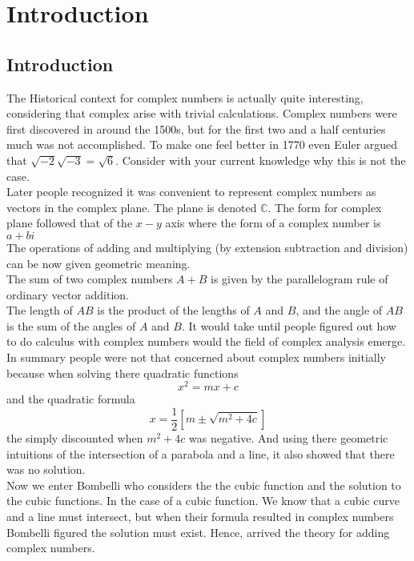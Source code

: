 \chapter{Introduction}
\section{Introduction}
		\indent The Historical context for complex numbers is actually quite interesting, considering that complex arise with trivial calculations. Complex numbers were first discovered in around the 1500s, but for the first two and a half centuries much was not accomplished. To make one feel better in 1770 even Euler argued that $ \sqrt{-2} \sqrt{-3} = \sqrt{6}$. Consider with your current knowledge why this is not the case. \\
		\indent Later people recognized it was convenient to represent complex numbers as vectors in the complex plane. The plane is denoted $ \mathbb{C} $. The form for complex plane followed that of the $ x-y $ axis where the form of a complex number is $ a + bi $ \\ 
		\indent The operations of adding and multiplying (by extension subtraction and division) can be now given geometric meaning. \\
		\indent The sum of two complex numbers $ A + B$ is given by the parallelogram rule of ordinary vector addition. \\ 
		\indent The length of $ AB $ is the product of the lengths of $ A $ and $ B $, and the angle of $ AB $ is the sum of the angles of $ A $ and $ B $. 
		\indent It would take until people figured out how to do calculus with complex numbers would the field of complex analysis emerge. \pagebreak
		\indent In summary people were not that concerned about complex numbers initially because when solving there quadratic functions 
		\[ x^2 = mx + c \] and the quadratic formula 
		\[ x = \dfrac{1}{2} [m \pm \sqrt{m^2 + 4c}] \] the simply discounted when $ m^2 + 4c $ was negative. And using there geometric intuitions of the intersection of a parabola and a line, it also showed that there was no solution. \\ 
		\indent Now we enter Bombelli who considers the the cubic function and the solution to the cubic functions. In the case of a cubic function. We know that a cubic curve and a line must intersect, but when their formula resulted in complex numbers Bombelli figured the solution must exist. Hence, arrived the theory for adding complex numbers. 

